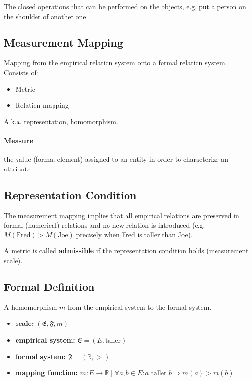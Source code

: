 The closed operations that can be performed on the objects, e.g.
put a person on the shoulder of another one


\subsection{Measurement Mapping}

Mapping from the empirical relation system onto a formal relation system. Consists of:
\begin{itemize}
  \item Metric
  \item Relation mapping
\end{itemize}

A.k.a. representation, homomorphism.

\paragraph{Measure} the value (formal element) assigned to an entity in order to characterize an attribute.


\subsection{Representation Condition}

The measurement mapping implies that all empirical relations are preserved in formal
(numerical) relations and no new relation is introduced
(e.g.\ $M(\text{Fred}) > M(\text{Joe})$ precisely when Fred is taller than Joe).

A metric is called \textbf{admissible} if the representation condition holds (measurement scale).

\subsection{Formal Definition}

A homomorphism $m$ from the empirical system to the formal system.
\begin{itemize}
  \item \textbf{scale:} $(\mathfrak{E},\mathfrak{F},m)$
  \item \textbf{empirical system:} $\mathfrak{E}=(E,\text{taller})$
  \item \textbf{formal system:} $\mathfrak{F}=(\mathbb{R},>)$
  \item \textbf{mapping function:} $m:E\rightarrow\mathbb{R} \mid \forall a,b\in E: a \text{ taller } b \Rightarrow m(a)>m(b)$
\end{itemize}

